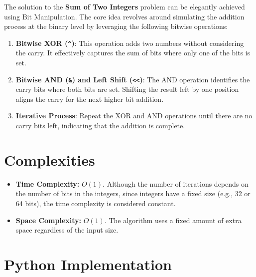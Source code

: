 The solution to the \textbf{Sum of Two Integers} problem can be elegantly achieved using Bit Manipulation. The core idea revolves around simulating the addition process at the binary level by leveraging the following bitwise operations:

\begin{enumerate}
    \item \textbf{Bitwise XOR (\texttt{\^})}: This operation adds two numbers without considering the carry. It effectively captures the sum of bits where only one of the bits is set.
    
    \item \textbf{Bitwise AND (\texttt{\&}) and Left Shift (\texttt{<<})}: The AND operation identifies the carry bits where both bits are set. Shifting the result left by one position aligns the carry for the next higher bit addition.
    
    \item \textbf{Iterative Process}: Repeat the XOR and AND operations until there are no carry bits left, indicating that the addition is complete.
\end{enumerate}


\section*{Complexities}

\begin{itemize}
    \item \textbf{Time Complexity:} \(O(1)\). Although the number of iterations depends on the number of bits in the integers, since integers have a fixed size (e.g., 32 or 64 bits), the time complexity is considered constant.
    
    \item \textbf{Space Complexity:} \(O(1)\). The algorithm uses a fixed amount of extra space regardless of the input size.
\end{itemize}

\section*{Python Implementation}


